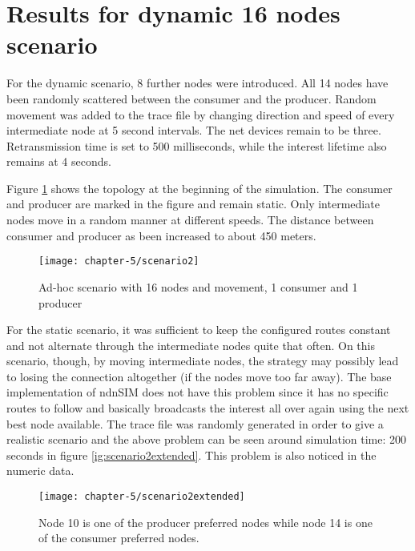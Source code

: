 \section{Results for dynamic 16 nodes scenario}

For the dynamic scenario, 8 further nodes were introduced. All 14 nodes have been randomly scattered between the consumer and the producer. Random movement was added to the trace file by changing direction and speed of every intermediate node at 5 second intervals. The net devices remain to be three. Retransmission time is set to 500 milliseconds, while the interest lifetime also remains at 4 seconds. 

Figure \ref{fig:scenario2} shows the topology at the beginning of the simulation. The consumer and producer are marked in the figure and remain static. Only intermediate nodes move in a random manner at different speeds. The distance between consumer and producer as been increased to about 450 meters.

\vspace{5mm} %

\begin{figure}[H]
  \centering
  \texttt{[image: chapter-5/scenario2]}
  \caption{Ad-hoc scenario with 16 nodes and movement, 1 consumer and 1 producer}
  \label{fig:scenario2}
\end{figure}

\vspace{5mm} %

For the static scenario, it was sufficient to keep the configured routes constant and not alternate through the intermediate nodes quite that often. On this scenario, though, by moving intermediate nodes, the strategy may possibly lead to losing the connection altogether (if the nodes move too far away). The base implementation of ndnSIM does not have this problem since it has no specific routes to follow and basically broadcasts the interest all over again using the next best node available. The trace file was randomly generated in order to give a realistic scenario and the above problem can be seen around simulation time: 200 seconds in figure \ref{ig:scenario2extended}. This problem is also noticed in the numeric data.

\begin{figure}[H]
  \centering
  \texttt{[image: chapter-5/scenario2extended]}
  \caption{Node 10 is one of the producer preferred nodes while node 14 is one of the consumer preferred nodes.}
  \label{fig:scenario2extended}
\end{figure}

